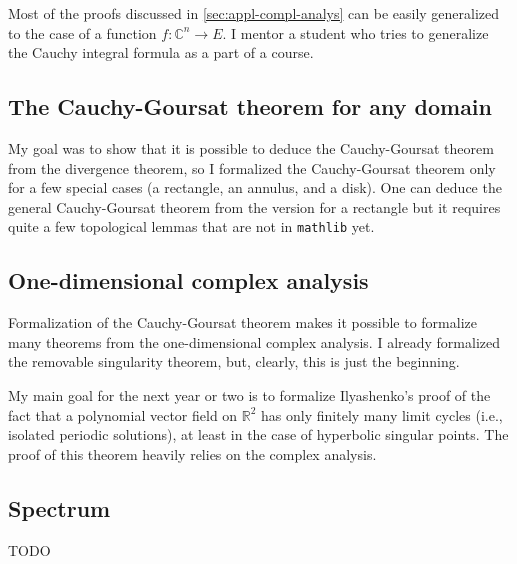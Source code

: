 \documentclass[a4paper, UKenglish,cleveref, autoref, thm-restate]{lipics-v2021}
\newcommand{\bbR}{\mathbb{R}}
\newcommand{\bbC}{\mathbb{C}}
\begin{document}
Most of the proofs discussed in \autoref{sec:appl-compl-analys} can be
easily generalized to the case of a function
\(f\colon \bbC^{n}\to E\). I mentor a student who tries to generalize
the Cauchy integral formula as a part of a course.

\subsection{The Cauchy-Goursat theorem for any domain}\label{sec:cauchy-goursat-any}

My goal was to show that it is possible to deduce the Cauchy-Goursat
theorem from the divergence theorem, so I formalized the
Cauchy-Goursat theorem only for a few special cases (a rectangle, an
annulus, and a disk). One can deduce the general Cauchy-Goursat
theorem from the version for a rectangle but it requires quite a few
topological lemmas that are not in \texttt{mathlib} yet.

\subsection{One-dimensional complex analysis}%
\label{sec:one-dimens-compl}

Formalization of the Cauchy-Goursat theorem makes it possible to
formalize many theorems from the one-dimensional complex analysis. I
already formalized the removable singularity theorem, but, clearly,
this is just the beginning.

My main goal for the next year or two is to formalize Ilyashenko's
proof of the fact that a polynomial vector field on \(\bbR^{2}\) has
only finitely many limit cycles (i.e., isolated periodic solutions),
at least in the case of hyperbolic singular points. The proof of this
theorem heavily relies on the complex analysis.

\subsection{Spectrum}%
\label{sec:spectrum}

TODO


\end{document}
